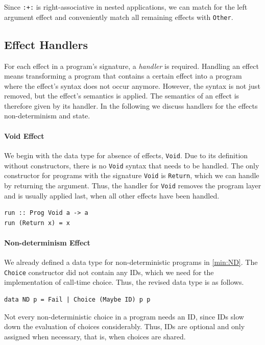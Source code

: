 \documentclass[a4paper, 11pt, fleqn, twoside]{scrreprt}
\newcommand{\hinl}[1]{\texttt{#1}}
\begin{document}
Since \hinl{:+:} is right-associative in nested applications, we can match for the left argument effect and conveniently match all remaining effects with \hinl{Other}.


\subsection{Effect Handlers}
\label{subsec:effectHandlers}
For each effect in a program's signature, a \textit{handler} is required.
Handling an effect means transforming a program that contains a certain effect into a program where the effect's syntax does not occur anymore.
However, the syntax is not just removed, but the effect's semantics is applied.
The semantics of an effect is therefore given by its handler.
In the following we discuss handlers for the effects non-determinism and state.

\paragraph{Void Effect}
We begin with the data type for absence of effects, \hinl{Void}.
Due to its definition without constructors, there is no \hinl{Void} syntax that needs to be handled.
The only constructor for programs with the signature \hinl{Void} is \hinl{Return}, which we can handle by returning the argument.
Thus, the handler for \hinl{Void} removes the program layer and is usually applied last, when all other effects have been handled.

\begin{verbatim}
run :: Prog Void a -> a
run (Return x) = x
\end{verbatim}

\paragraph{Non-determinism Effect}
We already defined a data type for non-deterministic programs in \autoref{min:ND}.
The \hinl{Choice} constructor did not contain any IDs, which we need for the implementation of call-time choice.
Thus, the revised data type is as follows.

\begin{verbatim}
data ND p = Fail | Choice (Maybe ID) p p
\end{verbatim}

Not every non-deterministic choice in a program needs an ID, since IDs slow down the evaluation of choices considerably.
Thus, IDs are optional and only assigned when necessary, that is, when choices are shared.
\end{document}
